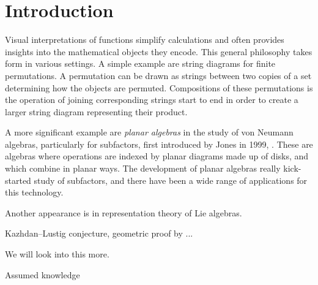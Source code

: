 \chapter{Introduction}

Visual interpretations of functions simplify calculations and often provides insights into the mathematical objects they encode.  This general philosophy takes form in various settings. A simple example are string diagrams for finite permutations. A permutation can be drawn as strings between two copies of a set determining how the objects are permuted. Compositions of these permutations is the operation of joining corresponding strings start to end in order to create a larger string diagram representing their product. 

A more significant example are \textit{planar algebras} in the study of von Neumann algebras, particularly for subfactors, first introduced by Jones in 1999, \cite{jones-planar-algebra}. These are algebras where operations are indexed by planar diagrams made up of disks, and which combine in planar ways. The development of planar algebras really kick-started study of subfactors, and there have been a wide range of applications for this technology. 


Another appearance is in representation theory of Lie algebras.

Kazhdan--Lustig conjecture, geometric proof by ...

We will look into this more.





Assumed knowledge




